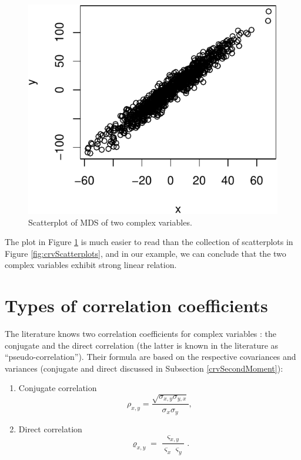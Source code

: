\documentclass[
]{book}
\begin{document}
\begin{figure}
\centering
\includegraphics{Svetunkov---Svetunkov---Complex-Dynamic-Models_files/figure-latex/crvScatterplotMDS-1.pdf}
\caption{\label{fig:crvScatterplotMDS}Scatterplot of MDS of two complex variables.}
\end{figure}

The plot in Figure \ref{fig:crvScatterplotMDS} is much easier to read than the collection of scatterplots in Figure \ref{fig:crvScatterplots}, and in our example, we can conclude that the two complex variables exhibit strong linear relation.

\hypertarget{types-of-correlation-coefficients}{%
\section{Types of correlation coefficients}\label{types-of-correlation-coefficients}}

The literature knows two correlation coefficients for complex variables \citep{ref}: the conjugate and the direct correlation (the latter is known in the literature as ``pseudo-correlation''). Their formula are based on the respective covariances and variances (conjugate and direct discussed in Subsection \ref{crvSecondMoment}):

\begin{enumerate}
\def\labelenumi{\arabic{enumi}.}
\item
  Conjugate correlation
  \begin{equation}
   \rho_{x,y} = \frac{\sqrt{\sigma_{x,y} \sigma_{y,x}}}{\sigma_x \sigma_y},
   \label{eq:correlationConventional}
  \end{equation}
\item
  Direct correlation
  \begin{equation}
   \varrho_{x,y} = \frac{\varsigma_{x,y}}{\varsigma_x \varsigma_y}.
   \label{eq:correlationPseudo}
  \end{equation}
\end{enumerate}
\end{document}
